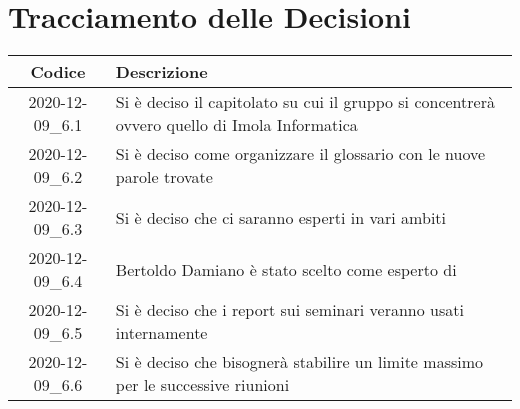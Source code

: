 \section*{Tracciamento delle Decisioni}

\begin{center}
	\begin{longtable}{|c|p{14.5cm}|}
	\hline
	\rowcolor{lighter-grayer}
	\textbf{Codice} & \textbf{Descrizione} \\
	\hline
	\endfirsthead

	
	2020-12-09\_6.1 & Si è deciso il capitolato su cui il gruppo si concentrerà ovvero quello di Imola Informatica \\
	\hline
	2020-12-09\_6.2 & Si è deciso come organizzare il glossario con le nuove parole trovate \\
	\hline
	2020-12-09\_6.3 & Si è deciso che ci saranno esperti in vari ambiti \\
	\hline
	2020-12-09\_6.4 & Bertoldo Damiano è stato scelto come esperto di \glock{\LaTeX} \\
	\hline
	2020-12-09\_6.5 & Si è deciso che i report sui seminari veranno usati internamente \\
	\hline
	2020-12-09\_6.6 & Si è deciso che bisognerà stabilire un limite massimo per le successive riunioni  \\
	\hline

	\end{longtable}
\end{center}
